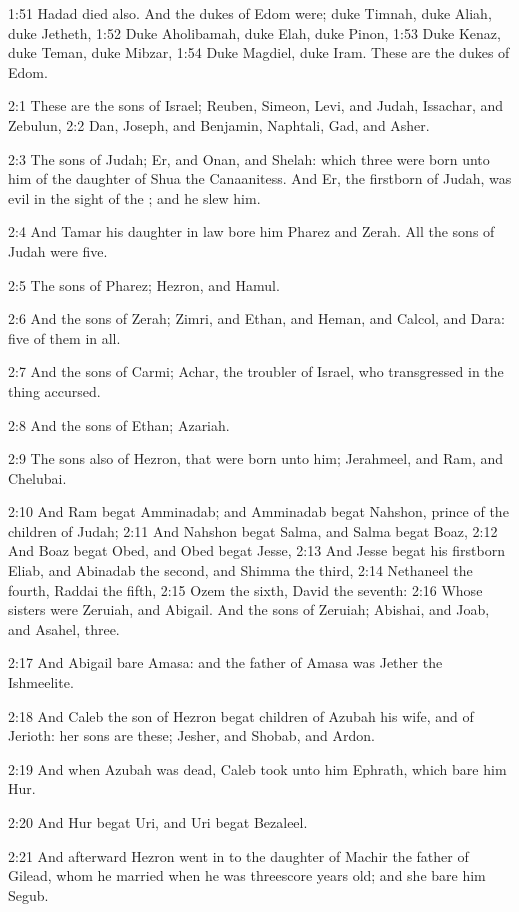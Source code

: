 1:51 Hadad died also. And the dukes of Edom were; duke Timnah, duke
Aliah, duke Jetheth, 1:52 Duke Aholibamah, duke Elah, duke Pinon, 1:53
Duke Kenaz, duke Teman, duke Mibzar, 1:54 Duke Magdiel, duke Iram.
These are the dukes of Edom.

2:1 These are the sons of Israel; Reuben, Simeon, Levi, and Judah,
Issachar, and Zebulun, 2:2 Dan, Joseph, and Benjamin, Naphtali, Gad,
and Asher.

2:3 The sons of Judah; Er, and Onan, and Shelah: which three were born
unto him of the daughter of Shua the Canaanitess. And Er, the
firstborn of Judah, was evil in the sight of the \LORD; and he slew
him.

2:4 And Tamar his daughter in law bore him Pharez and Zerah. All the
sons of Judah were five.

2:5 The sons of Pharez; Hezron, and Hamul.

2:6 And the sons of Zerah; Zimri, and Ethan, and Heman, and Calcol,
and Dara: five of them in all.

2:7 And the sons of Carmi; Achar, the troubler of Israel, who
transgressed in the thing accursed.

2:8 And the sons of Ethan; Azariah.

2:9 The sons also of Hezron, that were born unto him; Jerahmeel, and
Ram, and Chelubai.

2:10 And Ram begat Amminadab; and Amminadab begat Nahshon, prince of
the children of Judah; 2:11 And Nahshon begat Salma, and Salma begat
Boaz, 2:12 And Boaz begat Obed, and Obed begat Jesse, 2:13 And Jesse
begat his firstborn Eliab, and Abinadab the second, and Shimma the
third, 2:14 Nethaneel the fourth, Raddai the fifth, 2:15 Ozem the
sixth, David the seventh: 2:16 Whose sisters were Zeruiah, and
Abigail. And the sons of Zeruiah; Abishai, and Joab, and Asahel,
three.

2:17 And Abigail bare Amasa: and the father of Amasa was Jether the
Ishmeelite.

2:18 And Caleb the son of Hezron begat children of Azubah his wife,
and of Jerioth: her sons are these; Jesher, and Shobab, and Ardon.

2:19 And when Azubah was dead, Caleb took unto him Ephrath, which bare
him Hur.

2:20 And Hur begat Uri, and Uri begat Bezaleel.

2:21 And afterward Hezron went in to the daughter of Machir the father
of Gilead, whom he married when he was threescore years old; and she
bare him Segub.

